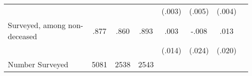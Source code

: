 \begin{tabular}{l*{7}{c}}
                    &            &            &            &      (.003)         &      (.005)         &      (.004)         \\
Surveyed, among non-deceased&        .877&        .860&        .893&        .003         &       -.008         &        .013         \\
                    &            &            &            &      (.014)         &      (.024)         &      (.020)         \\
Number Surveyed     &        5081&        2538&        2543&                     &                     &                     \\
\bottomrule
\end{tabular}
